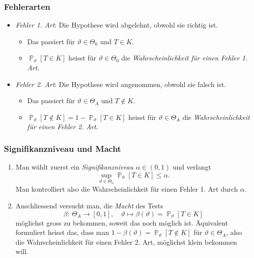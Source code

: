 \documentclass[a4paper,10pt]{article}
\renewcommand{\P}{\operatorname{\mathbb{P}}}
\numberwithin{equation}{section}
\begin{document}

\subsubsection{Fehlerarten}

\begin{itemize}
    \item \emph{Fehler 1. Art}: Die Hypothese wird abgelehnt, obwohl sie richtig ist.
    \begin{itemize}
        \item Das passiert für \( \vartheta \in \Theta_0 \) und \( T \in K \).
        \item \( \P_\vartheta[T \in K] \) heisst für \( \vartheta \in \Theta_0 \) die \emph{Wahrscheinlichkeit für einen Fehler 1. Art}.
    \end{itemize}
    \item \emph{Fehler 2. Art}: Die Hypothese wird angenommen, obwohl sie falsch ist.
    \begin{itemize}
        \item Das passiert für \( \vartheta \in \Theta_A \) und \( T \notin K \).
        \item \( \P_\vartheta[T \notin K] = 1 - \P_\vartheta[T \in K] \) heisst für \( \vartheta \in \Theta_A \) die \emph{Wahrscheinlichkeit für einen Fehler 2. Art}.
    \end{itemize}
\end{itemize}

\subsubsection{Signifikanzniveau und Macht}

\begin{enumerate}
    \item Man wählt zuerst ein \emph{Signifikanzniveau \( \alpha \in (0, 1) \)} und verlangt
    \[
        \sup_{\vartheta \in \Theta_0} \P_\vartheta[T \in K] \leq \alpha \text{.}
    \]
    Man kontrolliert also die Wahrscheinlichkeit für einen Fehler 1. Art durch \( \alpha \).
    \item Anschliessend versucht man, die \emph{Macht} des Tests
    \[
        \beta: \: \Theta_A \to [0, 1], \quad \vartheta \mapsto \beta(\vartheta) = \P_\vartheta[T \in K]
    \]
    möglichst gross zu bekommen, soweit das noch möglich ist.
    Äquivalent formuliert heisst das, dass man \( 1 - \beta(\vartheta) = \P_\vartheta[T \notin K] \) für \( \vartheta \in \Theta_A \), also die Wahrscheinlichkeit für einen Fehler 2. Art, möglichst klein bekommen will.
\end{enumerate}
\end{document}

